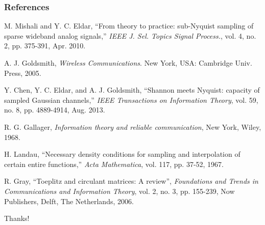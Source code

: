 \documentclass{beamer}
\begin{document}
\begin{frame}
\frametitle{References}
\scriptsize{
\begin{thebibliography}{1} %

    M. Mishali and Y. C. Eldar, ``From theory to practice: sub-Nyquist sampling of sparse wideband analog signals,'' \emph{IEEE J. Sel. Topics Signal Process.}, vol. 4, no. 2, pp. 375-391, Apr. 2010.

    A. J. Goldsmith, \emph{Wireless Communications}. New York, USA: Cambridge Univ. Press, 2005.

    Y. Chen, Y. C. Eldar, and A. J. Goldsmith, ``Shannon meets Nyquist: capacity of sampled Gaussian channels,'' \emph{IEEE Transactions on Information Theory}, vol. 59, no. 8, pp. 4889-4914, Aug. 2013.

  R. G. Gallager, \emph{Information theory and reliable communication}, New York, Wiley, 1968.
  
  H. Landau, ``Necessary density conditions for sampling and interpolation of certain entire functions,'' \emph{Acta Mathematica}, vol. 117, pp. 37-52, 1967.

  R. Gray, ``Toeplitz and circulant matrices: A review'', \emph{Foundations and Trends in Communications and Information Theory}, vol. 2, no. 3, pp. 155-239, Now Publishers, Delft, The Netherlands, 2006.

\end{thebibliography}
}
\end{frame}


\begin{frame}
\Huge{\centerline{Thanks!}}
\end{frame}

\end{document}
